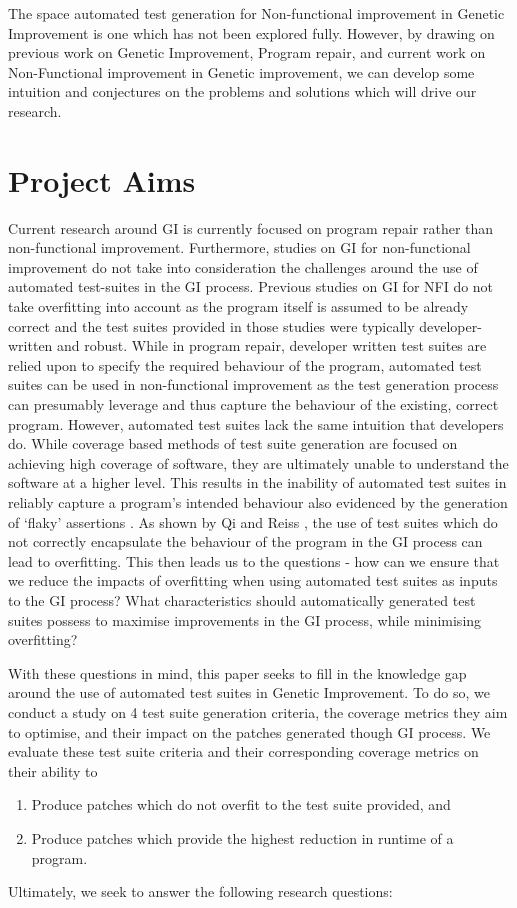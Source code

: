 \documentclass[titlepage]{article}
\begin{document}
The space automated test generation for Non-functional improvement in Genetic Improvement is one which has not been explored fully. However, by drawing on previous work on Genetic Improvement, Program repair, and current work on Non-Functional improvement in Genetic improvement, we can develop some intuition and conjectures on the problems and solutions which will drive our research. 


\section{Project Aims}

Current research around GI is currently focused on program repair rather than non-functional improvement. \cite{petkesurvey} Furthermore, studies on GI for non-functional improvement do not take into consideration the challenges around the use of automated test-suites in the GI process. Previous studies on GI for NFI do not take overfitting into account as the program itself is assumed to be already correct and the test suites provided in those studies were typically developer-written and robust\cite{petkegin}. While in program repair, developer written test suites are relied upon to specify the required behaviour of the program, automated test suites can be used in non-functional improvement as the test generation process can presumably leverage and thus capture the behaviour of the existing, correct program. However, automated test suites lack the same intuition that developers do. While coverage based methods of test suite generation are focused on achieving high coverage of software, they are ultimately unable to understand the software at a higher level. This results in the inability of automated test suites in reliably capture a program's intended behaviour \cite{evosuitefaults} also evidenced by the generation of ‘flaky’ assertions \cite{coveragecombination}. As shown by Qi and Reiss \cite{qireiss2017}, the use of test suites which do not correctly encapsulate the behaviour of the program in the GI process can lead to overfitting. This then leads us to the questions - how can we ensure that we reduce the impacts of overfitting when using automated test suites as inputs to the GI process? What characteristics should automatically generated test suites possess to maximise improvements in the GI process, while minimising overfitting?

With these questions in mind, this paper seeks to fill in the knowledge gap around the use of automated test suites in Genetic Improvement. To do so, we conduct a study on 4 test suite generation criteria, the coverage metrics they aim to optimise, and their impact on the patches generated though GI process. We evaluate these test suite criteria and their corresponding coverage metrics on their ability to
\begin{enumerate}
	\item Produce patches which do not overfit to the test suite provided, and 
	\item Produce patches which provide the highest reduction in runtime of a program. 
\end{enumerate}	
Ultimately, we seek to answer the following research questions:
\bigskip
\end{document}
